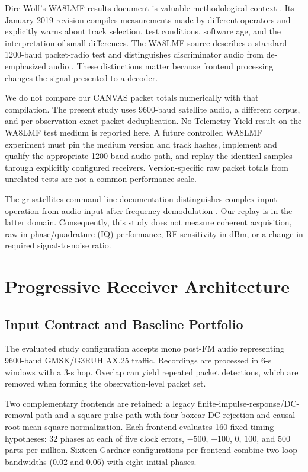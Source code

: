 \documentclass{ieeeaccess}
\begin{document}
Dire Wolf's WA8LMF results document is valuable methodological context \cite{direwolfresults}. Its January 2019 revision compiles measurements made by different operators and explicitly warns about track selection, test conditions, software age, and the interpretation of small differences. The WA8LMF source describes a standard 1200-baud packet-radio test and distinguishes discriminator audio from de-emphasized audio \cite{wa8lmf}. These distinctions matter because frontend processing changes the signal presented to a decoder.

We do not compare our CANVAS packet totals numerically with that compilation. The present study uses 9600-baud satellite audio, a different corpus, and per-observation exact-packet deduplication. No Telemetry Yield result on the WA8LMF test medium is reported here. A future controlled WA8LMF experiment must pin the medium version and track hashes, implement and qualify the appropriate 1200-baud audio path, and replay the identical samples through explicitly configured receivers. Version-specific raw packet totals from unrelated tests are not a common performance scale.

The gr-satellites command-line documentation distinguishes complex-input operation from audio input after frequency demodulation \cite{grsat}. Our replay is in the latter domain. Consequently, this study does not measure coherent acquisition, raw in-phase/quadrature (IQ) performance, RF sensitivity in dBm, or a change in required signal-to-noise ratio.

\section{Progressive Receiver Architecture}
\subsection{Input Contract and Baseline Portfolio}
The evaluated study configuration accepts mono post-FM audio representing 9600-baud GMSK/G3RUH AX.25 traffic. Recordings are processed in 6-s windows with a 3-s hop. Overlap can yield repeated packet detections, which are removed when forming the observation-level packet set.

Two complementary frontends are retained: a legacy finite-impulse-response/DC-removal path and a square-pulse path with four-boxcar DC rejection and causal root-mean-square normalization. Each frontend evaluates 160 fixed timing hypotheses: 32 phases at each of five clock errors, $-500$, $-100$, 0, $100$, and $500$ parts per million. Sixteen Gardner configurations per frontend combine two loop bandwidths (0.02 and 0.06) with eight initial phases.
\end{document}
